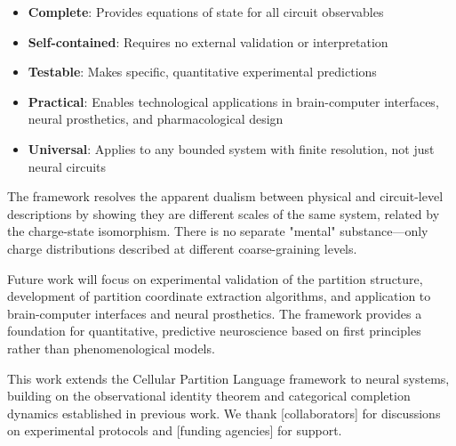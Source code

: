 \documentclass[aps,prd,twocolumn,superscriptaddress,floatfix,nofootinbib]{revtex4-2}
\theoremstyle{remark}
\begin{document}
\begin{itemize}
\item \textbf{Complete}: Provides equations of state for all circuit observables
\item \textbf{Self-contained}: Requires no external validation or interpretation
\item \textbf{Testable}: Makes specific, quantitative experimental predictions
\item \textbf{Practical}: Enables technological applications in brain-computer interfaces, neural prosthetics, and pharmacological design
\item \textbf{Universal}: Applies to any bounded system with finite resolution, not just neural circuits
\end{itemize}

The framework resolves the apparent dualism between physical and circuit-level descriptions by showing they are different scales of the same system, related by the charge-state isomorphism. There is no separate "mental" substance—only charge distributions described at different coarse-graining levels.

Future work will focus on experimental validation of the partition structure, development of partition coordinate extraction algorithms, and application to brain-computer interfaces and neural prosthetics. The framework provides a foundation for quantitative, predictive neuroscience based on first principles rather than phenomenological models.

\begin{acknowledgments}
This work extends the Cellular Partition Language framework to neural systems, building on the observational identity theorem and categorical completion dynamics established in previous work. We thank [collaborators] for discussions on experimental protocols and [funding agencies] for support.
\end{acknowledgments}




\end{document}
